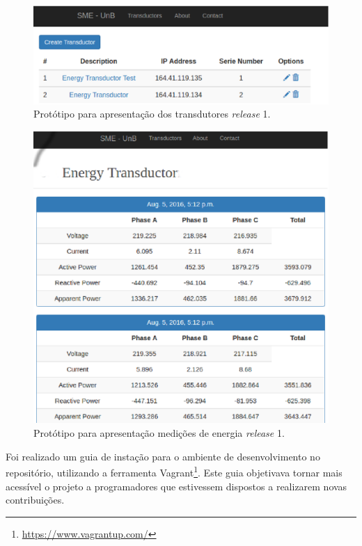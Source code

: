 \begin{figure}[!htb]
    \centering
    \includegraphics[keepaspectratio=true,scale=0.5]{figuras/coleta_dados_02.eps}
    \caption{Protótipo para apresentação dos transdutores \textit{release} 1.}
    \label{dados02}
\end{figure}

\begin{figure}[!htb]
    \centering
    \includegraphics[keepaspectratio=true,scale=0.5]{figuras/coleta_dados_01.eps}
    \caption{Protótipo para apresentação medições de energia \textit{release} 1.}
    \label{dados01}
\end{figure}

Foi realizado um guia de instação para o ambiente de desenvolvimento no repositório, utilizando a ferramenta Vagrant\footnote{\url{https://www.vagrantup.com/}}. Este guia objetivava tornar mais acessível o projeto a programadores que estivessem dispostos a realizarem novas contribuições.

